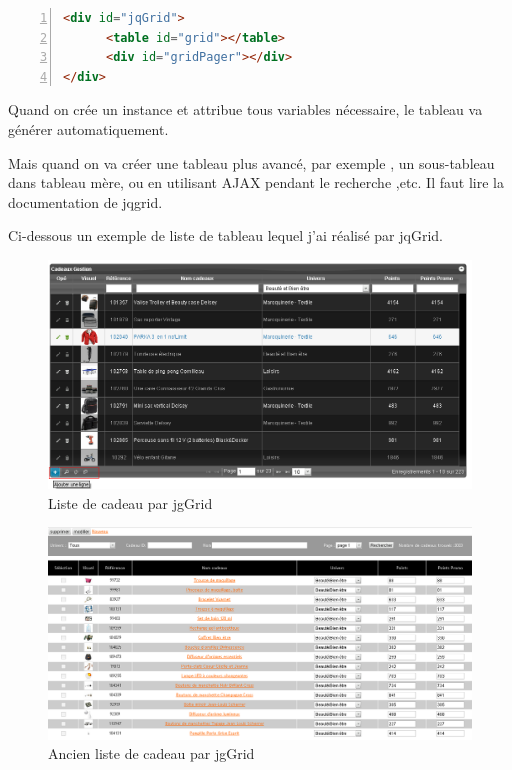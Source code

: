 \begin{lstlisting}[language= html, numbers=left, numberstyle=\tiny,  frame=shadowbox]
<div id="jqGrid">
      <table id="grid"></table>
      <div id="gridPager"></div>
</div>
\end{lstlisting}

Quand on crée un instance et attribue tous variables nécessaire, le tableau va générer automatiquement.

Mais quand on va créer une tableau plus avancé, par exemple , un sous-tableau dans tableau mère, ou en utilisant AJAX pendant le recherche ,etc. Il faut lire la documentation de jqgrid.

Ci-dessous un exemple de liste de tableau lequel j'ai réalisé par jqGrid.
\begin{figure}[hbtp]
\includegraphics[width=16cm]{body/images/cadeau-new.png}
\caption{Liste de cadeau par jgGrid}
\end{figure}

\begin{figure}[hbtp]
\includegraphics[width=16cm]{body/images/cadeau-old.png}
\caption{Ancien liste de cadeau par jgGrid}
\end{figure}

